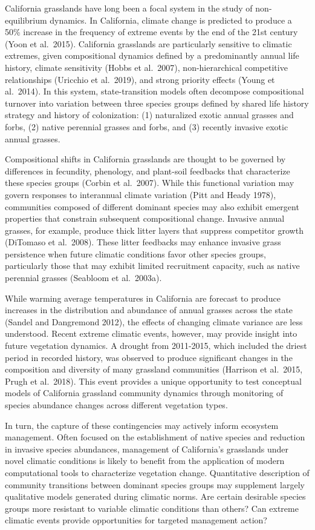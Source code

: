 \documentclass[twoside,12pt,final]{ucthesis-CA2012}
\begin{document}
\begin{ucmainmatter}
California grasslands have long been a focal system in the study of non-equilibrium dynamics.
In California, climate change is predicted to produce a 50\% increase in the frequency of extreme events by the end of the 21st century (Yoon et al.~2015).
California grasslands are particularly sensitive to climatic extremes, given compositional dynamics defined by a predominantly annual life history, climate sensitivity (Hobbs et al.~2007), non-hierarchical competitive relationships (Uricchio et al.~2019), and strong priority effects (Young et al.~2014).
In this system, state-transition models often decompose compositional turnover into variation between three species groups defined by shared life history strategy and history of colonization: (1) naturalized exotic annual grasses and forbs, (2) native perennial grasses and forbs, and (3) recently invasive exotic annual grasses.

Compositional shifts in California grasslands are thought to be governed by differences in fecundity, phenology, and plant-soil feedbacks that characterize these species groups (Corbin et al.~2007).
While this functional variation may govern responses to interannual climate variation (Pitt and Heady 1978), communities composed of different dominant species may also exhibit emergent properties that constrain subsequent compositional change.
Invasive annual grasses, for example, produce thick litter layers that suppress competitor growth (DiTomaso et al.~2008).
These litter feedbacks may enhance invasive grass persistence when future climatic conditions favor other species groups, particularly those that may exhibit limited recruitment capacity, such as native perennial grasses (Seabloom et al.~2003a).

While warming average temperatures in California are forecast to produce increases in the distribution and abundance of annual grasses across the state (Sandel and Dangremond 2012), the effects of changing climate variance are less understood.
Recent extreme climatic events, however, may provide insight into future vegetation dynamics.
A drought from 2011-2015, which included the driest period in recorded history, was observed to produce significant changes in the composition and diversity of many grassland communities (Harrison et al.~2015, Prugh et al.~2018).
This event provides a unique opportunity to test conceptual models of California grassland community dynamics through monitoring of species abundance changes across different vegetation types.

In turn, the capture of these contingencies may actively inform ecosystem management.
Often focused on the establishment of native species and reduction in invasive species abundances, management of California's grasslands under novel climatic conditions is likely to benefit from the application of modern computational tools to characterize vegetation change.
Quantitative description of community transitions between dominant species groups may supplement largely qualitative models generated during climatic norms. Are certain desirable species groups more resistant to variable climatic conditions than others? Can extreme climatic events provide opportunities for targeted management action?


\end{ucmainmatter}
\end{document}

